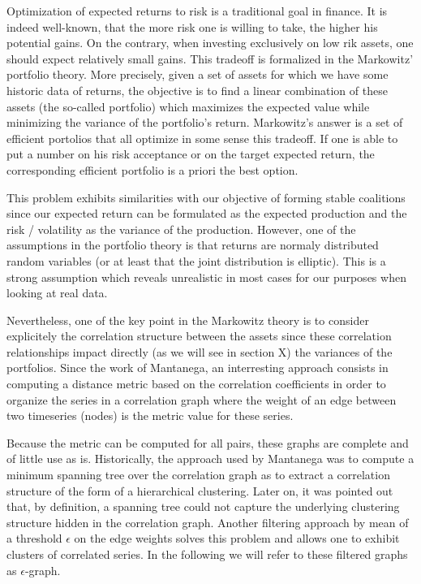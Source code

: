 \documentclass[conference]{IEEEtran}
\begin{document}
Optimization of expected returns to risk is a traditional goal in finance. It is indeed well-known, that the more risk one is willing to take, the higher his potential gains. On the contrary, when investing exclusively on low rik assets, one should expect relatively small gains. This tradeoff is formalized in the Markowitz' portfolio theory. More precisely, given a set of assets for which we have some historic data of returns, the objective is to find a linear combination of these assets (the so-called portfolio) which maximizes the expected value while minimizing the variance of the portfolio's return. Markowitz's answer is a set of efficient portolios that all optimize in some sense this tradeoff. If one is able to put a number on his risk acceptance or on the target expected return, the corresponding efficient portfolio is a priori the best option. 

This problem exhibits similarities with our objective of forming stable coalitions since our expected return can be formulated as the expected production and the risk / volatility as the variance of the production. However, one of the assumptions in the portfolio theory is that returns are normaly distributed random variables (or at least that the joint distribution is elliptic). This is a strong assumption which reveals unrealistic in most cases for our purposes when looking at real data.

Nevertheless, one of the key point in the Markowitz theory is to consider explicitely the correlation structure between the assets since these correlation relationships impact directly (as we will see in section X) the variances of the portfolios. Since the work of Mantanega, an interresting approach consists in computing a distance metric based on the correlation coefficients in order to organize the series in a correlation graph where the weight of an edge between two timeseries (nodes) is the metric value for these series.

Because the metric can be computed for all pairs, these graphs are complete and of little use as is. Historically, the approach used by Mantanega was to compute a minimum spanning tree over the correlation graph as to extract a correlation structure of the form of a hierarchical clustering. Later on, it was pointed out that, by definition, a spanning tree could not capture the underlying clustering structure hidden in the correlation graph. Another filtering approach by mean of a threshold $ \epsilon $ on the edge weights solves this problem and allows one to exhibit clusters of correlated series. In the following we will refer to these filtered graphs as $ \epsilon $-graph.
\end{document}
